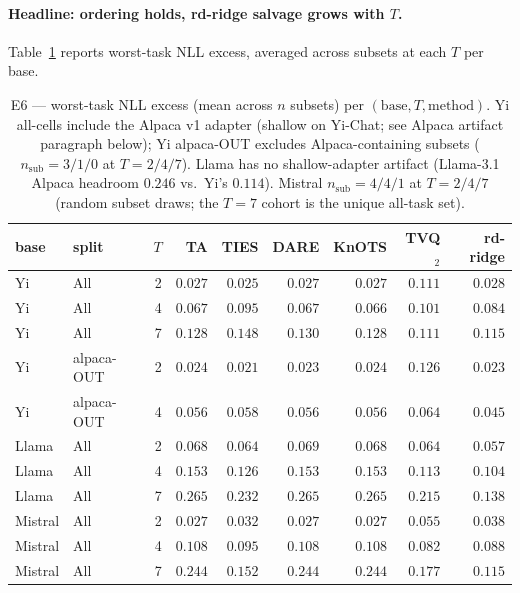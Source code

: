 \paragraph{Headline: ordering holds, rd-ridge salvage grows with $T$.}
Table~\ref{tab:e6-worst} reports worst-task NLL excess, averaged
across subsets at each $T$ per base.

\begin{table}[t]
\centering
\caption{E6 — worst-task NLL excess (mean across $n$ subsets) per
$(\text{base}, T, \text{method})$. Yi all-cells include the Alpaca v1
adapter (shallow on Yi-Chat; see Alpaca artifact paragraph below);
Yi alpaca-OUT excludes Alpaca-containing subsets ($n_{\text{sub}} =
3 / 1 / 0$ at $T = 2 / 4 / 7$). Llama has no shallow-adapter artifact
(Llama-3.1 Alpaca headroom $0.246$ vs.\ Yi's $0.114$). Mistral
$n_{\text{sub}} = 4 / 4 / 1$ at $T = 2 / 4 / 7$ (random subset draws;
the $T = 7$ cohort is the unique all-task set).}
\label{tab:e6-worst}
\begin{tabular}{llr|rrrrrr}
\hline
base & split & $T$ & TA & TIES & DARE & KnOTS & TVQ$_2$ & rd-ridge \\
\hline
Yi    & All        & 2 & $0.027$ & $0.025$ & $0.027$ & $0.027$ & $0.111$ & $0.028$ \\
Yi    & All        & 4 & $0.067$ & $0.095$ & $0.067$ & $0.066$ & $0.101$ & $0.084$ \\
Yi    & All        & 7 & $0.128$ & $0.148$ & $0.130$ & $0.128$ & $0.111$ & $\mathbf{0.115}$ \\
Yi    & alpaca-OUT & 2 & $0.024$ & $0.021$ & $0.023$ & $0.024$ & $0.126$ & $0.023$ \\
Yi    & alpaca-OUT & 4 & $0.056$ & $0.058$ & $0.056$ & $0.056$ & $0.064$ & $\mathbf{0.045}$ \\
\hline
Llama & All        & 2 & $0.068$ & $0.064$ & $0.069$ & $0.068$ & $0.064$ & $\mathbf{0.057}$ \\
Llama & All        & 4 & $0.153$ & $0.126$ & $0.153$ & $0.153$ & $0.113$ & $\mathbf{0.104}$ \\
Llama & All        & 7 & $0.265$ & $0.232$ & $0.265$ & $0.265$ & $0.215$ & $\mathbf{0.138}$ \\
\hline
Mistral & All      & 2 & $0.027$ & $0.032$ & $0.027$ & $0.027$ & $0.055$ & $0.038$ \\
Mistral & All      & 4 & $0.108$ & $0.095$ & $0.108$ & $0.108$ & $0.082$ & $0.088$ \\
Mistral & All      & 7 & $0.244$ & $0.152$ & $0.244$ & $0.244$ & $0.177$ & $\mathbf{0.115}$ \\
\hline
\end{tabular}
\end{table}

